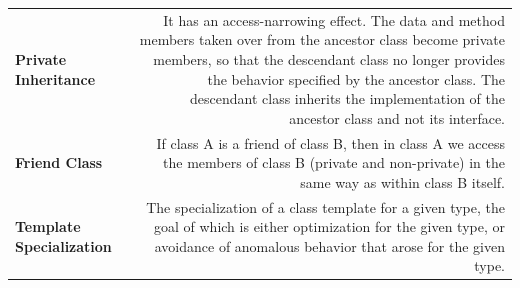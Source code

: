 \documentclass[margin=0px]{article}
\begin{document}
\begin{longtable}{L R}
\textbf{Private Inheritance} &
It has an access-narrowing effect. The data and method members taken over from the ancestor class become private members, so that the descendant class no longer provides the behavior specified by the ancestor class. The descendant class inherits the implementation of the ancestor class and not its interface. \\[4pt]

\textbf{Friend Class} &
If class A is a friend of class B, then in class A we access the members of class B (private and non-private) in the same way as within class B itself. \\[4pt]

\textbf{Template Specialization} &
The specialization of a class template for a given type, the goal of which is either optimization for the given type, or avoidance of anomalous behavior that arose for the given type. \\[4pt]

\end{longtable}
\end{document}

